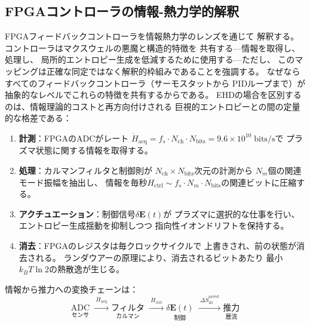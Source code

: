 \documentclass[12pt,twocolumn]{ltjsarticle}
\newcommand{\ee}{\mathbf{E}}
\newcommand{\Sdot}{\dot{S}_{\mathrm{irr}}}
\begin{document}
\subsection{FPGAコントローラの情報-熱力学的解釈}
\label{sec:discussion:demon}

FPGAフィードバックコントローラを情報熱力学のレンズを通じて
解釈する。コントローラはマクスウェルの悪魔と構造的特徴を
共有する---情報を取得し、処理し、
局所的エントロピー生成を低減するために使用する---ただし、
このマッピングは正確な同定ではなく解釈的枠組みであることを強調する。
なぜならすべてのフィードバックコントローラ（サーモスタットから
PIDループまで）が抽象的なレベルでこれらの特徴を共有するからである。
EHDの場合を区別するのは、情報理論的コストと再方向付けされる
巨視的エントロピーとの間の定量的な格差である：

\begin{enumerate}
  \item \textbf{計測}：FPGAのADCがレート
    $\dot{H}_{\mathrm{acq}} = f_s \cdot N_{\mathrm{ch}} \cdot
    N_{\mathrm{bits}} = 9.6 \times 10^{10}\;\mathrm{bits/s}$で
    プラズマ状態に関する情報を取得する。

  \item \textbf{処理}：カルマンフィルタと制御則が
    $N_{\mathrm{ch}} \times N_{\mathrm{bits}}$次元の計測から
    $N_m$個の関連モード振幅を抽出し、
    情報を毎秒$\dot{H}_{\mathrm{ctrl}} \sim f_s \cdot N_m \cdot
    N_{\mathrm{bits}}$の関連ビットに圧縮する。

  \item \textbf{アクチュエーション}：制御信号$\delta\ee(t)$が
    プラズマに選択的な仕事を行い、
    エントロピー生成揺動を抑制しつつ
    指向性イオンドリフトを保持する。

  \item \textbf{消去}：FPGAのレジスタは毎クロックサイクルで
    上書きされ、前の状態が消去される。
    ランダウアーの原理により、消去されるビットあたり
    最小$k_B T \ln 2$の熱散逸が生じる。
\end{enumerate}

情報から推力への変換チェーンは：
\begin{equation}
  \underset{\text{センサ}}{\text{ADC}}
  \;\xrightarrow{\;\dot{H}_{\mathrm{acq}}\;}
  \underset{\text{カルマン}}{\text{フィルタ}}
  \;\xrightarrow{\;\dot{H}_{\mathrm{ctrl}}\;}
  \underset{\text{制御}}{\delta\ee(t)}
  \;\xrightarrow{\;\Delta\Sdot^{\mathrm{saved}}\;}
  \underset{\text{層流}}{\text{推力}}
  \label{eq:info_chain}
\end{equation}
\end{document}
